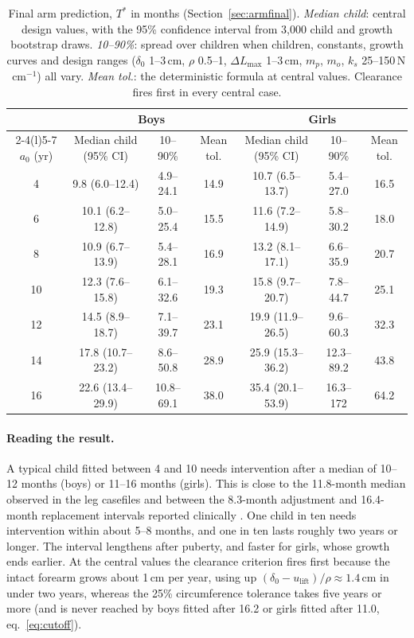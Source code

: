 \documentclass[11pt]{article}
\newcommand{\lift}{u_{\mathrm{lift}}}
\theoremstyle{definition}
\begin{document}
\begin{table}[htbp]
\centering\footnotesize
\setlength{\tabcolsep}{3.5pt}
\caption{Final arm prediction, $T^*$ in months (Section~\ref{sec:armfinal}). \emph{Median child}: central design values, with the 95\% confidence interval from 3,000 child and growth bootstrap draws. \emph{10--90\%}: spread over children when children, constants, growth curves and design ranges ($\delta_0$ 1--3\,cm, $\rho$ 0.5--1, $\Delta L_{\max}$ 1--3\,cm, $m_p$, $m_o$, $k_s$ 25--150\,N\,cm$^{-1}$) all vary. \emph{Mean tol.}: the deterministic formula at central values. Clearance fires first in every central case.}
\label{tab:arm}
\begin{tabular}{@{}c ccc ccc@{}}
\toprule
 & \multicolumn{3}{c}{Boys} & \multicolumn{3}{c}{Girls}\\
\cmidrule(lr){2-4}\cmidrule(l){5-7}
$a_0$ (yr) & Median child (95\% CI) & 10--90\% & Mean tol. & Median child (95\% CI) & 10--90\% & Mean tol.\\
\midrule
4  & 9.8 (6.0--12.4)   & 4.9--24.1  & 14.9 & 10.7 (6.5--13.7)  & 5.4--27.0  & 16.5\\
6  & 10.1 (6.2--12.8)  & 5.0--25.4  & 15.5 & 11.6 (7.2--14.9)  & 5.8--30.2  & 18.0\\
8  & 10.9 (6.7--13.9)  & 5.4--28.1  & 16.9 & 13.2 (8.1--17.1)  & 6.6--35.9  & 20.7\\
10 & 12.3 (7.6--15.8)  & 6.1--32.6  & 19.3 & 15.8 (9.7--20.7)  & 7.8--44.7  & 25.1\\
12 & 14.5 (8.9--18.7)  & 7.1--39.7  & 23.1 & 19.9 (11.9--26.5) & 9.6--60.3  & 32.3\\
14 & 17.8 (10.7--23.2) & 8.6--50.8  & 28.9 & 25.9 (15.3--36.2) & 12.3--89.2 & 43.8\\
16 & 22.6 (13.4--29.9) & 10.8--69.1 & 38.0 & 35.4 (20.1--53.9) & 16.3--172  & 64.2\\
\bottomrule
\end{tabular}
\end{table}

\paragraph{Reading the result.} A typical child fitted between 4 and 10 needs intervention after a median of 10--12 months (boys) or 11--16 months (girls). This is close to the 11.8-month median observed in the leg casefiles and between the 8.3-month adjustment and 16.4-month replacement intervals reported clinically \cite{ghidini2025}. One child in ten needs intervention within about 5--8 months, and one in ten lasts roughly two years or longer. The interval lengthens after puberty, and faster for girls, whose growth ends earlier. At the central values the clearance criterion fires first because the intact forearm grows about 1\,cm per year, using up $(\delta_0-\lift)/\rho\approx1.4$\,cm in under two years, whereas the 25\% circumference tolerance takes five years or more (and is never reached by boys fitted after 16.2 or girls fitted after 11.0, eq.~\eqref{eq:cutoff}).
\end{document}
